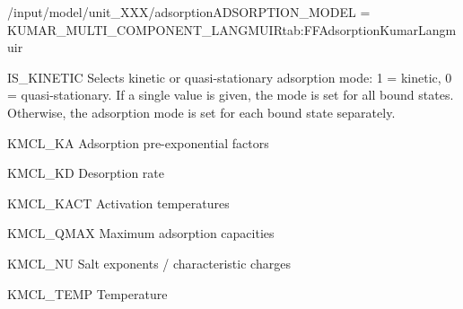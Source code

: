 \begin{condsubgroup}{/input/model/unit\_XXX/adsorption}{ADSORPTION\_MODEL = KUMAR\_MULTI\_COMPONENT\_LANGMUIR}{tab:FFAdsorptionKumarLangmuir}
\begin{dataset}[type=int,range={$\{ 0,1 \}$},length={1 / \texttt{NTOTALBND}}]{IS\_KINETIC}
    Selects kinetic or quasi-stationary adsorption mode: 1 = kinetic, 0 = quasi-stationary.
    If a single value is given, the mode is set for all bound states.
    Otherwise, the adsorption mode is set for each bound state separately.
  \end{dataset}
  \begin{dataset}[unit=\si{\raiseto{3}\metre\of{MP}\per\mol\per\second}, type=double,range={$\geq 0$},length={\texttt{NCOMP}}]{KMCL\_KA}
    Adsorption pre-exponential factors
  \end{dataset}
  \begin{dataset}[unit=\si{\raiseto{3\nu_i}\metre\of{MP}\per\raiseto{\nu_i}\mol\per\second}, type=double,range={$\geq 0$},length={\texttt{NCOMP}}]{KMCL\_KD}
    Desorption rate
  \end{dataset}
\begin{dataset}[unit=\si{\kelvin}, type = double, range={$\geq 0$}, length={\texttt{NCOMP}}]{KMCL\_KACT} 
  Activation temperatures
  \end{dataset}
\begin{dataset}[unit=\si{\mol\per\cubic\metre\of{SP}} , type = double, range={$> 0$}, length={\texttt{NCOMP}}]{KMCL\_QMAX} 
  Maximum adsorption capacities
  \end{dataset}
\begin{dataset}[type = double, range={$> 0$}, length={\texttt{NCOMP}}]{KMCL\_NU} 
  Salt exponents / characteristic charges 
  \end{dataset}
\begin{dataset}[unit=\si{\kelvin}, type = double, range={$\geq 0$}, length={1}]{KMCL\_TEMP} 
  Temperature 
  \end{dataset}
\end{condsubgroup}

